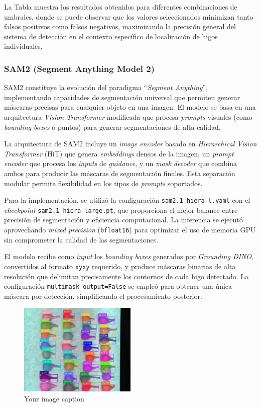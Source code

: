 
La Tabla muestra los resultados obtenidos para diferentes combinaciones de umbrales, donde se puede observar que los valores seleccionados minimizan tanto falsos positivos como falsos negativos, maximizando la precisión general del sistema de detección en el contexto específico de localización de higos individuales.

\subsubsection{SAM2 (Segment Anything Model 2)}

SAM2 constituye la evolución del paradigma ``\emph{Segment Anything}'', implementando capacidades de segmentación universal que permiten generar máscaras precisas para cualquier objeto en una imagen. El modelo se basa en una arquitectura \emph{Vision Transformer} modificada que procesa \emph{prompts} visuales (como \emph{bounding boxes} o puntos) para generar segmentaciones de alta calidad.



La arquitectura de SAM2 incluye un \emph{image encoder} basado en \emph{Hierarchical Vision Transformer} (HiT) que genera \emph{embeddings} densos de la imagen, un \emph{prompt encoder} que procesa los \emph{inputs} de \emph{guidance}, y un \emph{mask decoder} que combina ambos para producir las máscaras de segmentación finales. Esta separación modular permite flexibilidad en los tipos de \emph{prompts} soportados.

Para la implementación, se utilizó la configuración \texttt{sam2.1\_hiera\_l.yaml} con el \emph{checkpoint} \texttt{sam2.1\_hiera\_large.pt}, que proporciona el mejor balance entre precisión de segmentación y eficiencia computacional. La inferencia se ejecutó aprovechando \emph{mixed precision} (\texttt{bfloat16}) para optimizar el uso de memoria GPU sin comprometer la calidad de las segmentaciones.

El modelo recibe como \emph{input} los \emph{bounding boxes} generados por \emph{Grounding DINO}, convertidos al formato \texttt{xyxy} requerido, y produce máscaras binarias de alta resolución que delimitan precisamente los contornos de cada higo detectado. La configuración \texttt{multimask\_output=False} se empleó para obtener una única máscara por detección, simplificando el procesamiento posterior.


\begin{figure}[h]
\centering
\includegraphics[width=0.5\textwidth]{images/dino_sam.jpg}
\caption{Your image caption}
\label{fig:your_label}
\end{figure}


